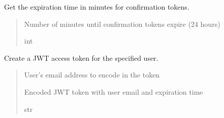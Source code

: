 \documentclass[letterpaper,10pt,openany,oneside,english]{sphinxmanual}
\begin{document}

\begin{savenotes}\begin{fulllineitems}
\label{\detokenize{modules/security:storeapi.security.confirm_token_expire_minutes}}
\pysigstartsignatures
{}
\pysigstopsignatures
\sphinxAtStartPar
Get the expiration time in minutes for confirmation tokens.
\begin{quote}\begin{description}
\sphinxAtStartPar
Number of minutes until confirmation tokens expire (24 hours)

\sphinxAtStartPar
int

\end{description}\end{quote}

\end{fulllineitems}\end{savenotes}


\begin{savenotes}\begin{fulllineitems}
\label{\detokenize{modules/security:storeapi.security.create_access_token}}
\pysigstartsignatures
{}
\pysigstopsignatures
\sphinxAtStartPar
Create a JWT access token for the specified user.
\begin{quote}\begin{description}
\sphinxAtStartPar
{} \textendash{} User’s email address to encode in the token

\sphinxAtStartPar
Encoded JWT token with user email and expiration time

\sphinxAtStartPar
str

\end{description}\end{quote}

\end{fulllineitems}\end{savenotes}
\end{document}
